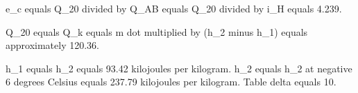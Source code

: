 e_c equals Q_20 divided by Q_AB equals Q_20 divided by i_H equals 4.239.  

Q_20 equals Q_k equals m dot multiplied by (h_2 minus h_1) equals approximately 120.36.  

h_1 equals h_2 equals 93.42 kilojoules per kilogram.  
h_2 equals h_2 at negative 6 degrees Celsius equals 237.79 kilojoules per kilogram.  
Table delta equals 10.